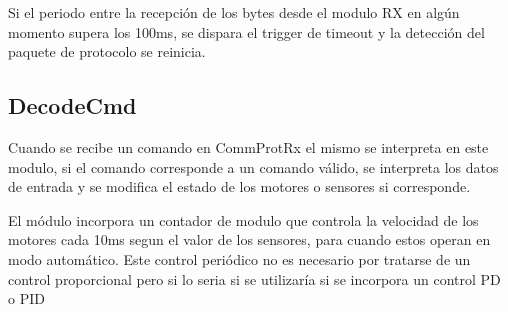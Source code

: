\documentclass[12pt]{article}
\begin{document}
Si el periodo entre la recepción de los bytes desde el modulo RX en algún momento supera los 100ms, se dispara el trigger de timeout y la detección del paquete de protocolo se reinicia.

\subsection{DecodeCmd}
Cuando se recibe un comando en CommProtRx el mismo se interpreta en este modulo, si el comando corresponde a un comando válido, se interpreta los datos de entrada y se modifica el estado de los motores o sensores si corresponde.

El módulo incorpora un contador de modulo que controla la velocidad de los motores cada 10ms segun el valor de los sensores, para cuando estos operan en modo automático. Este control periódico no es necesario por tratarse de un control proporcional pero si lo seria si se utilizaría si se incorpora un control PD o PID
\end{document}

